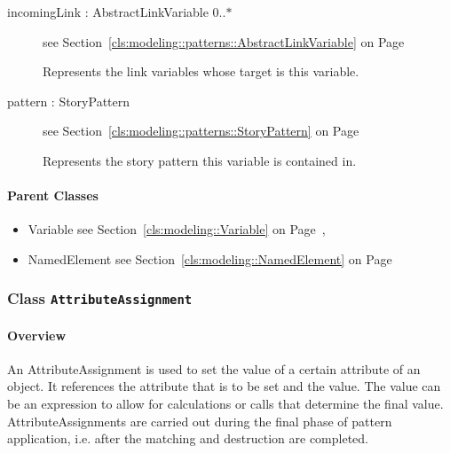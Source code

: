 \begin{description}
\begin{description}
	
\item[incomingLink : AbstractLinkVariable 			0..$*$]
see Section~\ref{cls:modeling::patterns::AbstractLinkVariable} on Page~\pageref{cls:modeling::patterns::AbstractLinkVariable}
\hspace{\fill}
\nopagebreak


	
			
Represents the link variables whose target is this variable.	
		
	
\item[pattern : StoryPattern 	]
see Section~\ref{cls:modeling::patterns::StoryPattern} on Page~\pageref{cls:modeling::patterns::StoryPattern}
\hspace{\fill}
\nopagebreak


	
			
Represents the story pattern this variable is contained in.	
		
	
	\end{description}
	

\end{description}

\paragraph{Parent Classes}
\begin{itemize}
\item Variable see Section~\ref{cls:modeling::Variable} on Page~\pageref{cls:modeling::Variable}, \item NamedElement see Section~\ref{cls:modeling::NamedElement} on Page~\pageref{cls:modeling::NamedElement}\end{itemize}
\subsubsection{\Large{Class \bfseries \texttt{AttributeAssignment}\normalfont}}
\label{cls:modeling::patterns::AttributeAssignment} 
\paragraph{Overview}

	
			
An AttributeAssignment is used to set the value of a certain attribute of an object. It references the attribute that is to be set and the value. The value can be an expression to allow for calculations or calls that determine the final value. AttributeAssignments are carried out during the final phase of pattern application, i.e. after the matching and destruction are completed.	
		
